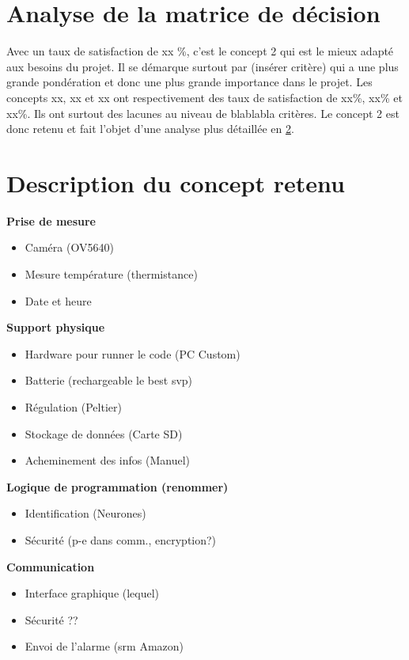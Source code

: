 \section{Analyse de la matrice de décision}

Avec un taux de satisfaction de xx \%, c'est le concept 2 qui est le mieux adapté aux besoins du projet. Il se démarque surtout par (insérer critère) qui a une plus grande pondération et donc une plus grande importance dans le projet. Les concepts xx, xx et xx ont respectivement des taux de satisfaction de xx\%, xx\% et xx\%. Ils ont surtout des lacunes au niveau de blablabla critères. Le concept 2 est donc retenu et fait l'objet d'une analyse plus détaillée en \ref{ch7:concept_retenu}.

\section{Description du concept retenu}
\label{ch7:concept_retenu}

\textbf{Prise de mesure}
\begin{itemize}
    \item Caméra (OV5640)
    \item Mesure température (thermistance)
    \item Date et heure
\end{itemize}

\textbf{Support physique}
\begin{itemize}
    \item Hardware pour runner le code (PC Custom)
    \item Batterie (rechargeable le best svp)
    \item Régulation (Peltier)
    \item Stockage de données (Carte SD)
    \item Acheminement des infos (Manuel)
\end{itemize}

\textbf{Logique de programmation (renommer)}
\begin{itemize}
    \item Identification (Neurones)
    \item Sécurité (p-e dans comm., encryption?)
\end{itemize}

\textbf{Communication}
\begin{itemize}
    \item Interface graphique (lequel)
    \item Sécurité ??
    \item Envoi de l'alarme (srm Amazon)
\end{itemize}



